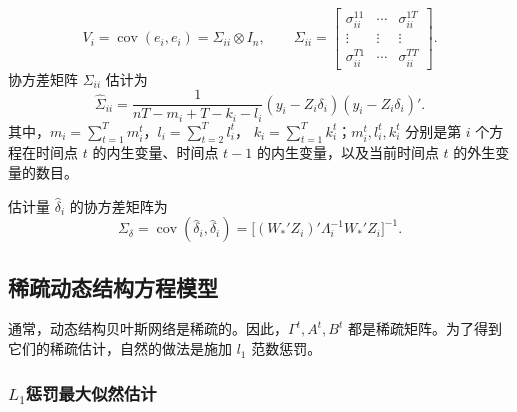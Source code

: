 \[
V_i=\operatorname{cov}(e_i,e_i)=\Sigma_{ii}\otimes I_n,
\qquad
\Sigma_{ii}=\begin{bmatrix}
\sigma_{ii}^{11}&\cdots&\sigma_{ii}^{1T}\\
\vdots&\vdots&\vdots\\\sigma_{ii}^{T1}&\cdots&\sigma_{ii}^{TT}
\end{bmatrix}.
\]
协方差矩阵 $\Sigma_{ii}$ 估计为
\begin{equation}
\widehat\Sigma_{ii}=
\frac{1}{nT-m_i+T-k_i-l_i}(y_i-Z_i\delta_i)(y_i-Z_i\delta_i)'.\tag{4.212}
\end{equation}
其中，$m_i=\sum_{t=1}^{T}m_i^t$，$l_i=\sum_{t=2}^{T}l_i^t$，
$k_i=\sum_{t=1}^{T}k_i^t$；$m_i^t,l_i^t,k_i^t$ 分别是第 $i$ 个方程在时间点 $t$ 的内生变量、时间点 $t-1$ 的内生变量，以及当前时间点 $t$ 的外生变量的数目。

估计量 $\widehat\delta_i$ 的协方差矩阵为
\begin{equation}
\Sigma_\delta=\operatorname{cov}(\widehat\delta_i,\widehat\delta_i)
=\bigl[(W_*'Z_i)'\Lambda_i^{-1}W_*'Z_i\bigr]^{-1}.\tag{4.213}
\end{equation}

\subsection{稀疏动态结构方程模型}

通常，动态结构贝叶斯网络是稀疏的。因此，$\Gamma^t,A^t,B^t$ 都是稀疏矩阵。为了得到它们的稀疏估计，自然的做法是施加 $l_1$ 范数惩罚。

\subsubsection{\texorpdfstring{$L_1$}{L1}惩罚最大似然估计}

